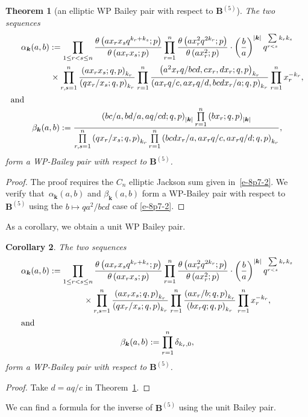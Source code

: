\documentclass[pdftex]{sigma}
\numberwithin{equation}{section}
\newtheorem{Theorem}{Theorem}[section]
\newtheorem{Corollary}[Theorem]{Corollary}
\newcommand\sumk{{\left| \boldsymbol{k} \right|}}
\newcommand{\B}{{ \mathbf B}}
\renewcommand{\k}{{ \boldsymbol{k}}}
\newcommand{\triprod}[1]{\prod\limits_{1\le r < s \le #1}}
\newcommand{\sqprod}[1]{\prod\limits_{r, s =1}^{#1}} %
\newcommand{\smallprod}[1]{\prod\limits_{r =1}^{#1}} %
\newcommand{\xover}[1]{#1_{r}/#1_{s}}
\newcommand{\ellipticqrfac}[2]{{\left({#1}; q, p\right)_{#2}}} %
\newcommand{\elliptictheta}[1]{\theta \left({#1} ; p\right) }
\begin{document}
\begin{Theorem}[an elliptic WP Bailey pair with respect to $\B^{(5)}$]\label{th:e-Bailey-Pair-B5.2} The two sequences
\begin{gather*}
\alpha_\k(a,b) := \triprod n \frac{\elliptictheta{ax_rx_sq^{k_r+k_s}}}{\elliptictheta{ax_rx_s}} \smallprod n \frac{\elliptictheta{ax_r^2q^{2k_r}}}{\elliptictheta{ax_r^2}} \cdot \left( \frac{b}{a}\right)^{\sumk} q^{\sum\limits_{r<s} k_r k_s} \notag\\
\hphantom{\alpha_\k(a,b) :=}{} \times
\sqprod n\frac{\ellipticqrfac{ax_rx_s}{k_r}}{\ellipticqrfac{q\xover x}{k_r} } \smallprod n \frac{\ellipticqrfac{a^2x_rq/bcd, cx_r, dx_r}{k_r}}
{\ellipticqrfac{ax_rq/c,ax_rq/d, bcdx_r/a }{k_r} }\smallprod n x_r^{-k_r}, \\
\intertext{and}
\beta_\k(a,b) := \frac{\ellipticqrfac{bc/a, bd/a, aq/cd}{\sumk}
 \smallprod n \ellipticqrfac{bx_r}{\sumk} }
 { \sqprod n\ellipticqrfac{q\xover x}{k_r}
 \smallprod n \ellipticqrfac{bcdx_r/a, ax_rq/c, ax_rq/d}{k_r} },%
\end{gather*}
form a WP-Bailey pair with respect to $\B^{(5)}$.
\end{Theorem}
\begin{proof}The proof requires the $C_n$ elliptic Jackson sum given in~\eqref{e-8p7-2}. We verify that~$\alpha_\k(a,b)$ and $\beta_\k(a,b)$ form a WP-Bailey pair with respect to~$\B^{(5)}$ using the $b\mapsto qa^2/bcd$ case of \eqref{e-8p7-2}.
\end{proof}

As a corollary, we obtain a unit WP Bailey pair.
\begin{Corollary}\label{th:e-Bailey-Pair-B5.1}
The two sequences
\begin{gather*}
\alpha_\k(a,b) := \triprod n \frac{\elliptictheta{ax_rx_sq^{k_r+k_s}}}{\elliptictheta{ax_rx_s}}
\smallprod n \frac{\elliptictheta{ax_r^2q^{2k_r}}}{\elliptictheta{ax_r^2}}
\cdot \left( \frac{b}{a}\right)^{\sumk}
 q^{\sum\limits_{r<s} k_r k_s} \\
\hphantom{\alpha_\k(a,b) :=}{} \times
\sqprod n\frac{\ellipticqrfac{ax_rx_s}{k_r}}{\ellipticqrfac{q\xover x}{k_r} } %
 \smallprod n \frac{\ellipticqrfac{ax_r/b}{k_r}}
{\ellipticqrfac{bx_rq }{k_r} } \smallprod n x_r^{-k_r},\\
 \intertext{and}
\beta_\k(a,b) := \smallprod n \delta_{k_r, 0},%
\end{gather*}
form a WP-Bailey pair with respect to $\B^{(5)}$.
\end{Corollary}
\begin{proof} Take $d=aq/c$ in Theorem~\ref{th:e-Bailey-Pair-B5.2}.
\end{proof}
We can find a formula for the inverse of $\B^{(5)}$ using the unit Bailey pair.
\end{document}
